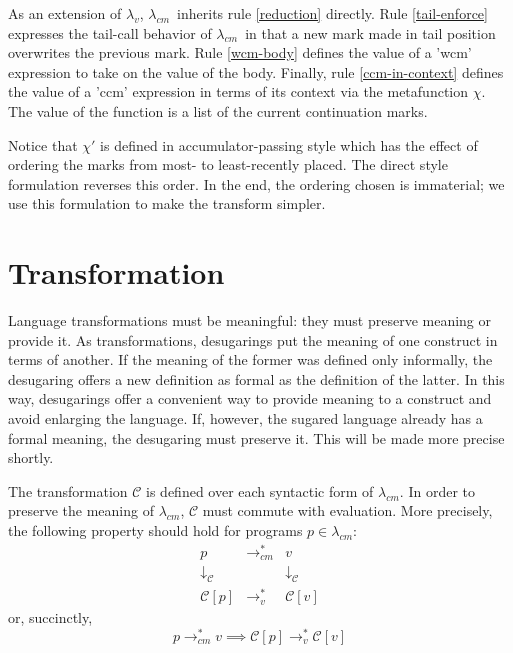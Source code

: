 \documentclass{llncs}
\newcommand{\cm}[0]{$\lambda_{cm}$}
\newcommand{\lv}[0]{$\lambda_v$}
\newcommand{\lvrrs}[0]{\rightarrow_v^{*}}
\newcommand{\cmrrs}[0]{\rightarrow_{cm}^{*}}
\newcommand{\C}[1]{\mathcal{C}[#1]}
\begin{document}
As an extension of \lv, \cm\ inherits rule \ref{reduction} directly. Rule \ref{tail-enforce} expresses the tail-call behavior of \cm\ in that a new mark made in tail position overwrites the previous mark. Rule \ref{wcm-body} defines the value of a \scheme'wcm' expression to take on the value of the body. Finally, rule \ref{ccm-in-context} defines the value of a \scheme'ccm' expression in terms of its context via the metafunction $\chi$. The value of the function is a list of the current continuation marks.

Notice that $\chi'$ is defined in accumulator-passing style which has the effect of ordering the marks from most- to least-recently placed. The direct style formulation reverses this order. In the end, the ordering chosen is immaterial; we use this formulation to make the transform simpler.

\section{Transformation}

Language transformations must be meaningful: they must preserve meaning or provide it. As transformations, desugarings put the meaning of one construct in terms of another. If the meaning of the former was defined only informally, the desugaring offers a new definition as formal as the definition of the latter. In this way, desugarings offer a convenient way to provide meaning to a construct and avoid enlarging the language. If, however, the sugared language already has a formal meaning, the desugaring must preserve it. This will be made more precise shortly.

The transformation $\mathcal{C}$ is defined over each syntactic form of \cm. In order to preserve the meaning of \cm, $\mathcal{C}$ must commute with evaluation. More precisely, the following property should hold for programs $p\in\lambda_{cm}$:
\[
\begin{array}{ccc}
p & \cmrrs & v\\
\downarrow_\mathcal{C} & & \downarrow_\mathcal{C}\\
\C{p} & \lvrrs & \C{v}
\end{array}
\]
or, succinctly,
\begin{equation}
\label{meaning-preservation-property}
p\cmrrs v\implies\C{p}\lvrrs\C{v}
\end{equation}

\end{document}
